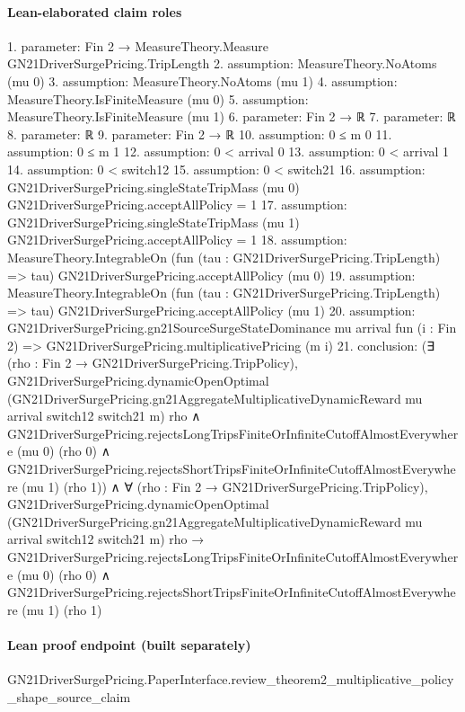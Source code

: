 \documentclass[10pt]{article}
\begin{document}
\paragraph{Lean-elaborated claim roles}\begin{ReviewVerbatim}
1. parameter: Fin 2 → MeasureTheory.Measure GN21DriverSurgePricing.TripLength
2. assumption: MeasureTheory.NoAtoms (mu 0)
3. assumption: MeasureTheory.NoAtoms (mu 1)
4. assumption: MeasureTheory.IsFiniteMeasure (mu 0)
5. assumption: MeasureTheory.IsFiniteMeasure (mu 1)
6. parameter: Fin 2 → ℝ
7. parameter: ℝ
8. parameter: ℝ
9. parameter: Fin 2 → ℝ
10. assumption: 0 ≤ m 0
11. assumption: 0 ≤ m 1
12. assumption: 0 < arrival 0
13. assumption: 0 < arrival 1
14. assumption: 0 < switch12
15. assumption: 0 < switch21
16. assumption: GN21DriverSurgePricing.singleStateTripMass (mu 0) GN21DriverSurgePricing.acceptAllPolicy = 1
17. assumption: GN21DriverSurgePricing.singleStateTripMass (mu 1) GN21DriverSurgePricing.acceptAllPolicy = 1
18. assumption: MeasureTheory.IntegrableOn (fun (tau : GN21DriverSurgePricing.TripLength) => tau) GN21DriverSurgePricing.acceptAllPolicy
  (mu 0)
19. assumption: MeasureTheory.IntegrableOn (fun (tau : GN21DriverSurgePricing.TripLength) => tau) GN21DriverSurgePricing.acceptAllPolicy
  (mu 1)
20. assumption: GN21DriverSurgePricing.gn21SourceSurgeStateDominance mu arrival fun (i : Fin 2) =>
  GN21DriverSurgePricing.multiplicativePricing (m i)
21. conclusion: (∃ (rho : Fin 2 → GN21DriverSurgePricing.TripPolicy),
    GN21DriverSurgePricing.dynamicOpenOptimal
        (GN21DriverSurgePricing.gn21AggregateMultiplicativeDynamicReward mu arrival switch12 switch21 m) rho ∧
      GN21DriverSurgePricing.rejectsLongTripsFiniteOrInfiniteCutoffAlmostEverywhere (mu 0) (rho 0) ∧
        GN21DriverSurgePricing.rejectsShortTripsFiniteOrInfiniteCutoffAlmostEverywhere (mu 1) (rho 1)) ∧
  ∀ (rho : Fin 2 → GN21DriverSurgePricing.TripPolicy),
    GN21DriverSurgePricing.dynamicOpenOptimal
        (GN21DriverSurgePricing.gn21AggregateMultiplicativeDynamicReward mu arrival switch12 switch21 m) rho →
      GN21DriverSurgePricing.rejectsLongTripsFiniteOrInfiniteCutoffAlmostEverywhere (mu 0) (rho 0) ∧
        GN21DriverSurgePricing.rejectsShortTripsFiniteOrInfiniteCutoffAlmostEverywhere (mu 1) (rho 1)
\end{ReviewVerbatim}

\paragraph{Lean proof endpoint (built separately)}\begin{ReviewVerbatim}
GN21DriverSurgePricing.PaperInterface.review_theorem2_multiplicative_policy_shape_source_claim
\end{ReviewVerbatim}
\end{document}
